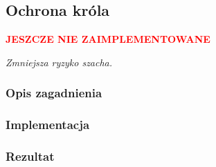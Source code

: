 \subsection{Ochrona króla}
\label{subsec:ochrona-krola}
\begin{center}
    \textcolor{red}{\textbf{JESZCZE NIE ZAIMPLEMENTOWANE}}
\end{center}
\textit{Zmniejsza ryzyko szacha.}

\subsubsection{Opis zagadnienia}
\subsubsection{Implementacja}
\subsubsection{Rezultat}